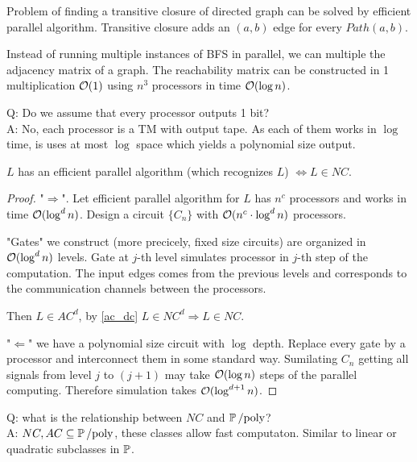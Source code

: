 \begin{example}
	Problem of finding a transitive closure of directed graph can be solved by efficient parallel algorithm.
	Transitive closure adds an $(a, b)$ edge for every $Path(a, b)$.

	Instead of running multiple instances of BFS in parallel, we can multiple the adjacency matrix of a graph.
	The reachability matrix can be constructed in 1 multiplication $\mathcal{O}(1)$ using $n^3$ processors in time $\mathcal{O}(\log n)$.
\end{example}

Q: Do we assume that every processor outputs 1 bit?\\
A: No, each processor is a TM with output tape. As each of them works in $\log$ time, is uses at most $\log$ space which yields a polynomial size output.

\begin{theorem}
	$L$ has an efficient parallel algorithm (which recognizes $L$) $\iff L \in NC$.
\end{theorem}
\begin{proof}
	"$\Rightarrow$". Let efficient parallel algorithm for $L$ has $n^c$ processors and works in time $\mathcal{O}(\log^d n)$.
	Design a circuit $\{ C_n \}$ with $\mathcal{O}(n^c \cdot \log^d n)$ processors.

	"Gates" we construct (more precicely, fixed size circuits) are organized in $\mathcal{O}(\log^d n)$ levels.
	Gate at $j$-th level simulates processor in $j$-th step of the computation.
	The input edges comes from the previous levels and corresponds to the communication channels between the processors.

	Then $L \in AC^d$, by \cref{ac_dc} $L \in NC^d \Rightarrow L \in NC$.

	"$\Leftarrow$" we have a polynomial size circuit with $\log$ depth.
	Replace every gate by a processor and interconnect them in some standard way.
	Sumilating $C_n$ getting all signals from level $j$ to $(j + 1)$ may take $\mathcal{O}(\log n)$ steps of the parallel computing.
	Therefore simulation takes $\mathcal{O}(\log^{d + 1} n)$.
\end{proof}

Q: what is the relationship between $NC$ and $\operatorname{\operatorname{\mathbb{P}}/poly}$?\\
A: $NC, AC \subseteq \operatorname{\operatorname{\mathbb{P}}/poly}$, these classes allow fast computaton. Similar to linear or quadratic subclasses in $\operatorname{\mathbb{P}}$.
